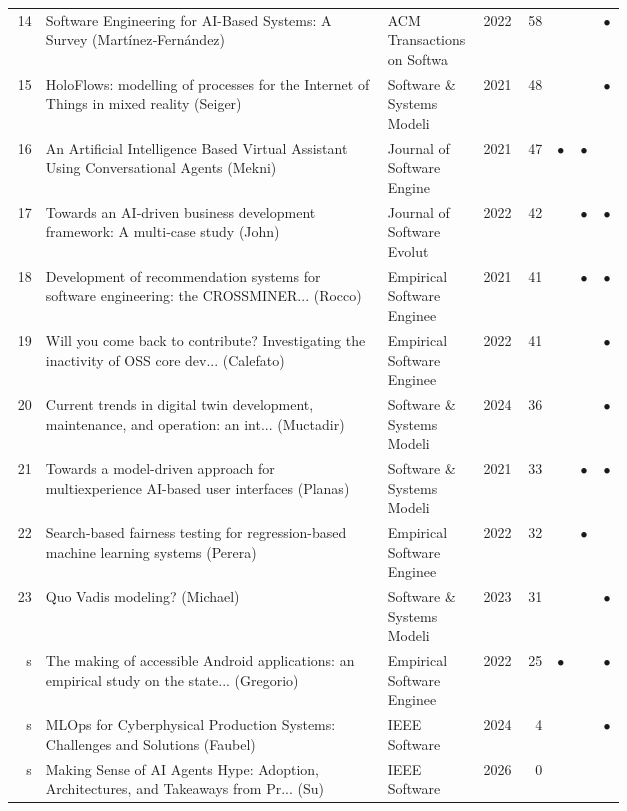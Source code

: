 \begin{tabular}{@{}rp{0.56\linewidth}p{0.15\linewidth}rrccc@{}}
14 & Software Engineering for AI-Based Systems: A Survey (Martínez‐Fernández) & ACM Transactions on Softwa & 2022 & 58 &  &  & $\bullet$\\
15 & HoloFlows: modelling of processes for the Internet of Things in mixed reality (Seiger) & Software \& Systems Modeli & 2021 & 48 &  &  & $\bullet$\\
16 & An Artificial Intelligence Based Virtual Assistant Using Conversational Agents (Mekni) & Journal of Software Engine & 2021 & 47 & $\bullet$ & $\bullet$ & \\
17 & Towards an AI‐driven business development framework: A multi‐case study (John) & Journal of Software Evolut & 2022 & 42 &  & $\bullet$ & $\bullet$\\
18 & Development of recommendation systems for software engineering: the CROSSMINER... (Rocco) & Empirical Software Enginee & 2021 & 41 &  & $\bullet$ & $\bullet$\\
19 & Will you come back to contribute? Investigating the inactivity of OSS core dev... (Calefato) & Empirical Software Enginee & 2022 & 41 &  &  & $\bullet$\\
20 & Current trends in digital twin development, maintenance, and operation: an int... (Muctadir) & Software \& Systems Modeli & 2024 & 36 &  &  & $\bullet$\\
21 & Towards a model-driven approach for multiexperience AI-based user interfaces (Planas) & Software \& Systems Modeli & 2021 & 33 &  & $\bullet$ & $\bullet$\\
22 & Search-based fairness testing for regression-based machine learning systems (Perera) & Empirical Software Enginee & 2022 & 32 &  & $\bullet$ & \\
23 & Quo Vadis modeling? (Michael) & Software \& Systems Modeli & 2023 & 31 &  &  & $\bullet$\\
s & The making of accessible Android applications: an empirical study on the state... (Gregorio) & Empirical Software Enginee & 2022 & 25 & $\bullet$ &  & $\bullet$\\
s & MLOps for Cyberphysical Production Systems: Challenges and Solutions (Faubel) & IEEE Software & 2024 & 4 &  &  & $\bullet$\\
s & Making Sense of AI Agents Hype: Adoption, Architectures, and Takeaways from Pr... (Su) & IEEE Software & 2026 & 0 &  &  & \\
\bottomrule
\end{tabular}
